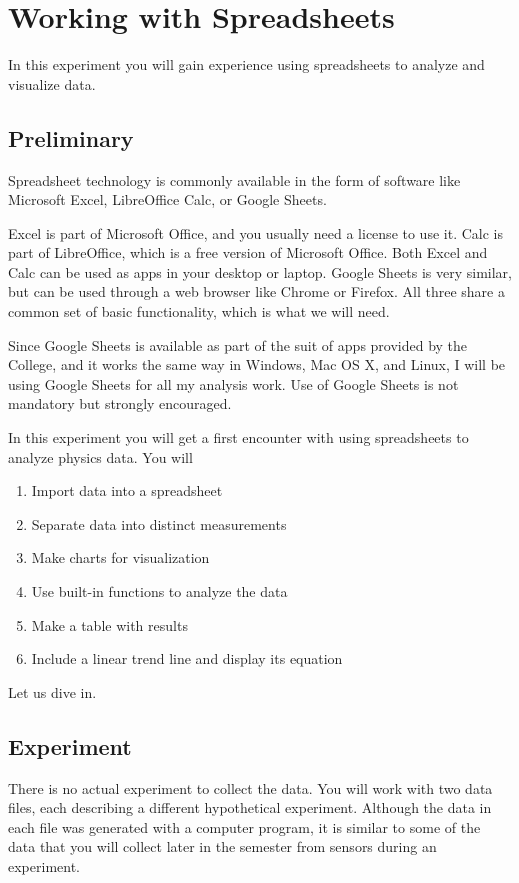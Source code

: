 \setcounter{chapter}{0}
\chapter{Working with Spreadsheets}
In this experiment you will gain experience using spreadsheets to analyze and visualize data.
\section{Preliminary}
Spreadsheet technology is commonly available in the form of software like Microsoft Excel, LibreOffice Calc, or Google Sheets.

Excel is part of Microsoft Office, and you usually need a license to use it. Calc is part of LibreOffice, which is a free version of Microsoft Office. Both Excel and Calc can be used as apps in your desktop or laptop. Google Sheets is very similar, but can be used through a web browser like Chrome or Firefox. All three share a common set of basic functionality, which is what we will need.

Since Google Sheets is available as part of the suit of apps provided by the College, and it works the same way in Windows, Mac OS X, and Linux, I will be using Google Sheets for all my analysis work. Use of Google Sheets is not mandatory but strongly encouraged.

In this experiment you will get a first encounter with using spreadsheets to analyze physics data. You will
\begin{enumerate}
    \item Import data into a spreadsheet
    \item Separate data into distinct measurements
    \item Make charts for visualization
    \item Use built-in functions to analyze the data
    \item Make a table with results
    \item Include a linear trend line and display its equation
\end{enumerate}
Let us dive in.
\section{Experiment}
There is no actual experiment to collect the data. You will work with two data files, each describing a different hypothetical experiment. Although the data in each file was generated with a computer program, it is similar to some of the data that you will collect later in the semester from sensors during an experiment.
